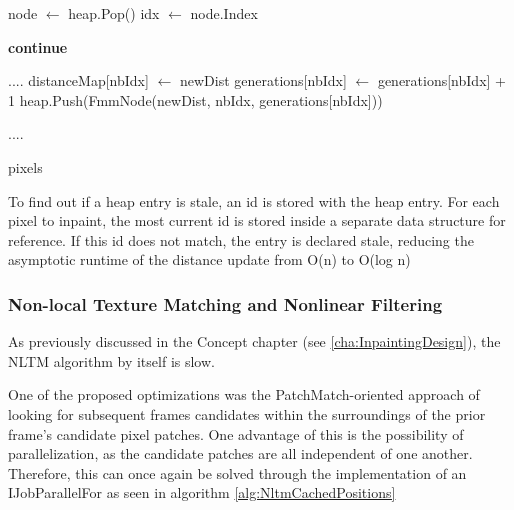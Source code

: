 \begin{algorithm}[ht!]
\caption{Fast Marching Method MinHeap Stale Entry handling}
\label{alg:FMMHeap}
\begin{algorithmic}[1]

        \State node $\gets$ heap.Pop()
        \State idx $\gets$ node.Index

            \State \textbf{continue}
        \EndIf

        ....
            \State distanceMap[nbIdx] $\gets$ newDist
            \State generations[nbIdx] $\gets$ generations[nbIdx] + 1
            \State heap.Push(FmmNode(newDist, nbIdx, generations[nbIdx]))
        \EndIf
        
        ....
    \EndWhile

    \State \Return pixels
\EndFunction
\end{algorithmic}
\end{algorithm}

To find out if a heap entry is stale, an id is stored with the heap entry. For each pixel to inpaint, the most current id is stored inside a separate data structure for reference. If this id does not match, the entry is declared stale, reducing the asymptotic runtime of the distance update from O(n) to O(log n)

\subsubsection{Non-local Texture Matching and Nonlinear Filtering}
\label{cha:NLTMImpl}

As previously discussed in the Concept chapter (see \ref{cha:InpaintingDesign}), the NLTM algorithm by itself is slow. 

One of the proposed optimizations was the PatchMatch-oriented approach of looking for subsequent frames candidates within the surroundings of the prior frame's candidate pixel patches. One advantage of this is the possibility of parallelization, as the candidate patches are all independent of one another.
Therefore, this can once again be solved through the implementation of an IJobParallelFor as seen in algorithm \ref{alg:NltmCachedPositions}

